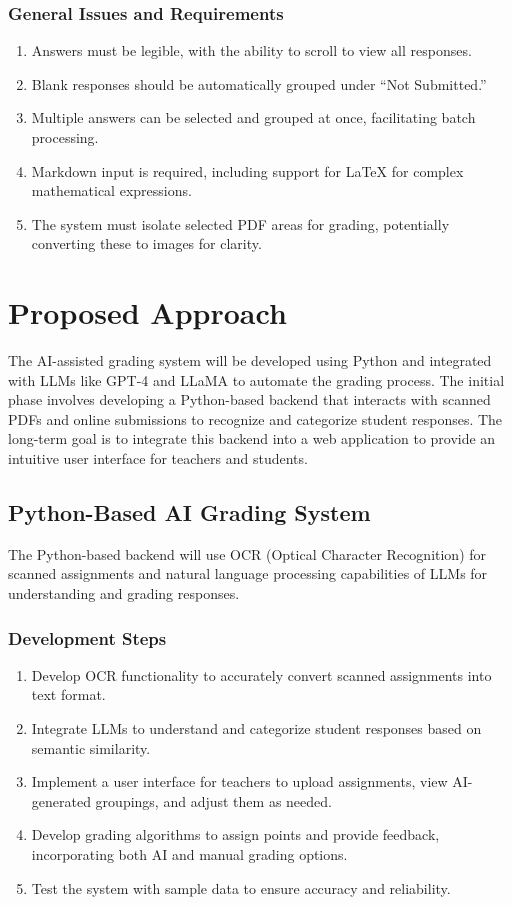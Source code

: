 \documentclass[ms,twoside,print]{nuthesis}
\begin{document}
\subsubsection{General Issues and Requirements}
\begin{enumerate}
    \item Answers must be legible, with the ability to scroll to view all responses.
    \item Blank responses should be automatically grouped under “Not Submitted.”
    \item Multiple answers can be selected and grouped at once, facilitating batch processing.
    \item Markdown input is required, including support for LaTeX for complex mathematical expressions.
    \item The system must isolate selected PDF areas for grading, potentially converting these to images for clarity.
\end{enumerate}

\section{Proposed Approach}

The AI-assisted grading system will be developed using Python and integrated with LLMs like GPT-4 and LLaMA to automate the grading process. 
The initial phase involves developing a Python-based backend that interacts with scanned PDFs and online submissions to recognize and categorize 
student responses. The long-term goal is to integrate this backend into a web application to provide an intuitive user interface for teachers and students.

\subsection{Python-Based AI Grading System}
The Python-based backend will use OCR (Optical Character Recognition) for scanned assignments and natural language processing capabilities 
of LLMs for understanding and grading responses.

\subsubsection{Development Steps}
\begin{enumerate}
    \item Develop OCR functionality to accurately convert scanned assignments into text format.
    \item Integrate LLMs to understand and categorize student responses based on semantic similarity.
    \item Implement a user interface for teachers to upload assignments, view AI-generated groupings, and adjust them as needed.
    \item Develop grading algorithms to assign points and provide feedback, incorporating both AI and manual grading options.
    \item Test the system with sample data to ensure accuracy and reliability.
\end{enumerate}
\end{document}
